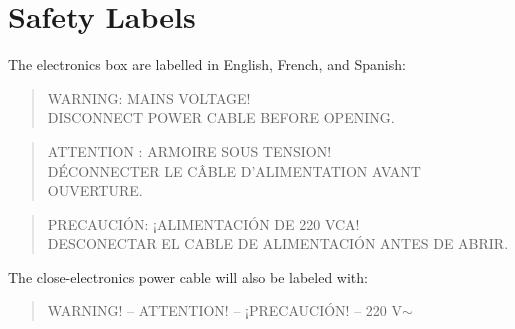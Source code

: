 \documentclass{article}
\begin{document}
\clearpage
\section{Safety Labels}

The electronics box are labelled in English, French, and Spanish: 

\begin{quote}
WARNING: MAINS VOLTAGE!\\
DISCONNECT POWER CABLE BEFORE OPENING.
\end{quote}

\begin{quote}
ATTENTION : ARMOIRE SOUS TENSION!\\
DÉCONNECTER LE CÂBLE D'ALIMENTATION AVANT OUVERTURE.
\end{quote}

\begin{quote}
PRECAUCIÓN: ¡ALIMENTACIÓN DE 220 VCA!\\
DESCONECTAR EL CABLE DE ALIMENTACIÓN ANTES DE ABRIR.
\end{quote}

The close-electronics power cable will also be labeled with:

\begin{quote}
WARNING! -- ATTENTION! -- ¡PRECAUCIÓN! -- 220 V$\sim$
\end{quote}


%
\end{document}
